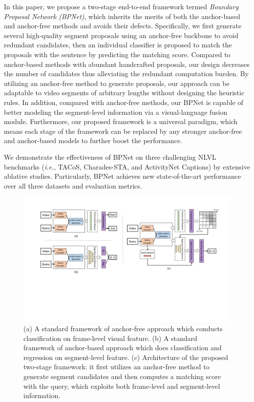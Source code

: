 \documentclass[letterpaper]{article} %
\newcommand{\ie}{\emph{i.e.}}
\begin{document}
In this paper, we propose a two-stage end-to-end framework termed \emph{Boundary Proposal Network (BPNet)},
which inherits the merits of both the anchor-based and anchor-free methods and avoids their defects.
Specifically, we first generate several high-quality segment proposals using an anchor-free backbone to avoid redundant candidates, then an individual classifier is proposed to match the proposals with the sentence by predicting the matching score.
Compared to anchor-based methods with abundant handcrafted proposals, our design decreases the number of candidates thus alleviating the redundant computation burden.
By utilizing an anchor-free method to generate proposals, our approach can be adaptable to video segments of arbitrary lengths without designing the heuristic rules.
In addition, compared with anchor-free methods, our BPNet is capable of better modeling the segment-level information via a visual-language fusion module.
Furthermore, our proposed framework is a universal paradigm, which means each stage of the framework can be replaced by any stronger anchor-free and anchor-based models to further boost the performance.

We demonstrate the effectiveness of BPNet on three challenging NLVL benchmarks (\ie, TACoS, Charades-STA, and ActivityNet Captions) by extensive ablative studies. Particularly, BPNet achieves new state-of-the-art performance over all three datasets and evaluation metrics.


\begin{figure}
\centering
\includegraphics[width=\textwidth]{figure2-1_cut.pdf}
\caption{(a) A standard framework of anchor-free approach which conducts classification on frame-level visual feature.
(b) A standard framework of anchor-based approach which does classification
and regression on segment-level feature.
(c) Architecture of the proposed two-stage framework: it first utilizes an
anchor-free method to generate segment candidates and then computes a matching score with the query, which exploits both frame-level and segment-level information.
}
\label{figure2}
\end{figure}
\end{document}
